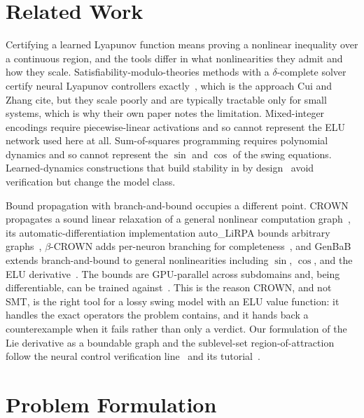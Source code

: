 \documentclass[letterpaper,journal]{IEEEtran}
\begin{document}
\section{Related Work}
Certifying a learned Lyapunov function means proving a nonlinear inequality over a
continuous region, and the tools differ in what nonlinearities they admit and how
they scale. Satisfiability-modulo-theories methods with a $\delta$-complete
solver certify neural Lyapunov controllers exactly~\cite{chang2019neural}, which
is the approach Cui and Zhang cite, but they scale poorly and are typically
tractable only for small systems, which is why their own paper notes the
limitation. Mixed-integer encodings require piecewise-linear activations and so
cannot represent the ELU network used here at all. Sum-of-squares programming
requires polynomial dynamics and so cannot represent the $\sin$ and $\cos$ of the
swing equations. Learned-dynamics constructions that build stability in by
design~\cite{manek2019stable} avoid verification but change the model class.

Bound propagation with branch-and-bound occupies a different point. CROWN
propagates a sound linear relaxation of a general nonlinear computation
graph~\cite{zhang2018crown}, its automatic-differentiation implementation
auto\_LiRPA bounds arbitrary graphs~\cite{xu2020autolirpa}, $\beta$-CROWN adds
per-neuron branching for completeness~\cite{wang2021betacrown}, and GenBaB
extends branch-and-bound to general nonlinearities including $\sin$, $\cos$, and
the ELU derivative~\cite{shi2024genbab}. The bounds are GPU-parallel across
subdomains and, being differentiable, can be trained
against~\cite{shi2024certified}. This is the reason CROWN, and not SMT, is the
right tool for a lossy swing model with an ELU value function: it handles the
exact operators the problem contains, and it hands back a counterexample when it
fails rather than only a verdict. Our formulation of the Lie derivative as a
boundable graph and the sublevel-set region-of-attraction follow the neural
control verification line~\cite{yang2024lyapunov} and its
tutorial~\cite{tutorial2026abcrown}.

\section{Problem Formulation}
\end{document}

